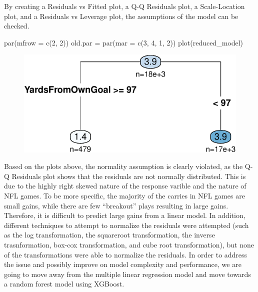 \documentclass[
  super,
  preprint,
  3p]{elsarticle}
\newenvironment{Shaded}{\begin{snugshade}}{\end{snugshade}}
\newcommand{\AttributeTok}[1]{\textcolor[rgb]{0.40,0.45,0.13}{#1}}
\newcommand{\DecValTok}[1]{\textcolor[rgb]{0.68,0.00,0.00}{#1}}
\newcommand{\FunctionTok}[1]{\textcolor[rgb]{0.28,0.35,0.67}{#1}}
\newcommand{\NormalTok}[1]{\textcolor[rgb]{0.00,0.23,0.31}{#1}}
\newcommand{\OtherTok}[1]{\textcolor[rgb]{0.00,0.23,0.31}{#1}}
\begin{document}
By creating a Residuals vs Fitted plot, a Q-Q Residuals plot, a
Scale-Location plot, and a Residuals vs Leverage plot, the assumptions
of the model can be checked.

\begin{Shaded}
\begin{Highlighting}[]
\FunctionTok{par}\NormalTok{(}\AttributeTok{mfrow =} \FunctionTok{c}\NormalTok{(}\DecValTok{2}\NormalTok{, }\DecValTok{2}\NormalTok{))}
\NormalTok{old.par }\OtherTok{=} \FunctionTok{par}\NormalTok{(}\AttributeTok{mar =} \FunctionTok{c}\NormalTok{(}\DecValTok{3}\NormalTok{, }\DecValTok{4}\NormalTok{, }\DecValTok{1}\NormalTok{, }\DecValTok{2}\NormalTok{))}
\FunctionTok{plot}\NormalTok{(reduced\_model)}
\end{Highlighting}
\end{Shaded}

\begin{figure}[H]

{\centering \includegraphics{project_report_files/figure-pdf/unnamed-chunk-6-1.pdf}

}

\end{figure}

Based on the plots above, the normality assumption is clearly violated,
as the Q-Q Residuals plot shows that the residuals are not normally
distributed. This is due to the highly right skewed nature of the
response varible and the nature of NFL games. To be more specific, the
majority of the carries in NFL games are small gains, while there are
few ``breakout'' plays resulting in large gains. Therefore, it is
difficult to predict large gains from a linear model. In addition,
different techniques to attempt to normalize the residuals were
attempted (such as the log transformation, the squareroot
transformation, the inverse trasnformation, box-cox transformation, and
cube root transformation), but none of the transformations were able to
normalize the residuals. In order to address the issue and possibly
improve on model complexity and performance, we are going to move away
from the multiple linear regression model and move towards a random
forest model using XGBoost.
\end{document}
